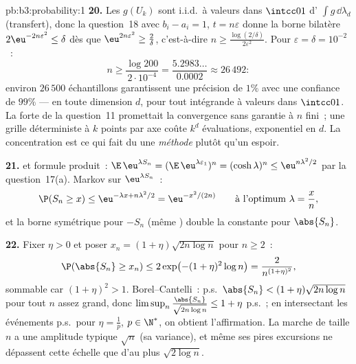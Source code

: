\begin{solution}{pb:b3:probability:1}
\textbf{20.} Les $g(U_k)$ sont i.i.d.\ à valeurs dans
$\intcc01$ d' $\int g\,\dd\lambda_d$ (transfert),
donc la question~18 avec $b_i - a_i = 1$, $t =
n\varepsilon$ donne la borne bilatère
$2\eu^{-2n\varepsilon^2} \leq \delta$ dès que
$\eu^{2n\varepsilon^2} \geq \frac2\delta$, c'est-à-dire $n
\geq \frac{\log(2/\delta)}{2\varepsilon^2}$. Pour
$\varepsilon = \delta = 10^{-2}$~:
\[
n \geq \frac{\log 200}{2\cdot10^{-4}} =
\frac{5.2983\ldots}{0.0002} \approx 26\,492 :
\]
environ $26\,500$ échantillons garantissent une précision
de $1\%$ avec une confiance de $99\%$ --- en toute
dimension $d$, pour tout intégrande  à valeurs
dans $\intcc01$. La  forte de la question~11 promettait
la convergence sans garantie à $n$ fini~; une grille
déterministe à $k$ points par axe coûte $k^d$ évaluations,
exponentiel en $d$. La concentration est ce qui fait du
 une \emph{méthode} plutôt qu'un espoir.

\textbf{21.}  et formule produit~:
$\E\,\eu^{\lambda S_n} = (\E\,\eu^{\lambda\varepsilon_1})^n
= (\cosh\lambda)^n \leq \eu^{n\lambda^2/2}$ par la
question~17(a). Markov sur $\eu^{\lambda S_n}$~:
\[
\P(S_n \geq x) \leq \eu^{-\lambda x + n\lambda^2/2}
= \eu^{-x^2/(2n)}
\qquad\text{à l'optimum } \lambda = \frac xn,
\]
et la borne symétrique pour $-S_n$ (même ) double la
constante pour $\abs{S_n}$.

\textbf{22.} Fixer $\eta > 0$ et poser $x_n = (1 +
\eta)\sqrt{2n\log n}$ pour $n \geq 2$~:
\[
\P(\abs{S_n} \geq x_n) \leq 2\exp\bigl(-(1 +
\eta)^2\log n\bigr) = \frac{2}{n^{(1+\eta)^2}},
\]
sommable car $(1 + \eta)^2 > 1$. Borel--Cantelli~: p.s.\
$\abs{S_n} < (1 + \eta)\sqrt{2n\log n}$ pour tout $n$
assez grand, donc $\limsup_n\frac{\abs{S_n}}{\sqrt{2n\log
n}} \leq 1 + \eta$ p.s.~; en intersectant les événements
p.s.\ pour $\eta = \frac1p$, $p \in \N^*$, on obtient
l'affirmation. La marche de taille $n$ a une amplitude
typique $\sqrt n$ (sa variance), et même ses pires
excursions ne dépassent cette échelle que d'au plus
$\sqrt{2\log n}$.


\end{solution}
